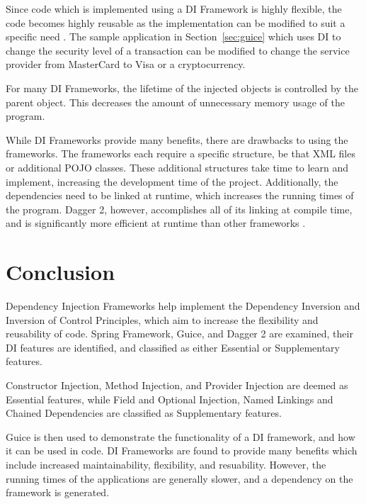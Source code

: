 \documentclass[12pt,twocolumn]{IEEEtran}
\begin{document}
Since code which is implemented using a DI Framework is highly flexible, the code becomes highly reusable as the implementation can be modified to suit a specific need \cite{hongyulyangewantemperohaydenmelton2008}. The sample application in Section~\ref{sec:guice} which uses DI to change the security level of a transaction can be modified to change the service provider from MasterCard to Visa or a cryptocurrency. 

For many DI Frameworks, the lifetime of the injected objects is controlled by the parent object. This decreases the amount of unnecessary memory usage of the program.

While DI Frameworks provide many benefits, there are drawbacks to using the frameworks. The frameworks each require a specific structure, be that XML files or additional POJO classes. These additional structures take time to learn and implement, increasing the development time of the project. Additionally, the dependencies need to be linked at runtime, which increases the running times of the program. Dagger 2, however, accomplishes all of its linking at compile time, and is significantly more efficient at runtime than other frameworks \cite{androiddeveloperguide}.


\section{Conclusion}

Dependency Injection Frameworks help implement the Dependency Inversion and Inversion of Control Principles, which aim to increase the flexibility and reusability of code. Spring Framework, Guice, and Dagger 2 are examined, their DI features are identified, and classified as either Essential or Supplementary features. 

Constructor Injection, Method Injection, and Provider Injection are deemed as Essential features, while Field and Optional Injection, Named Linkings and Chained Dependencies are classified as Supplementary features.

Guice is then used to demonstrate the functionality of a DI framework, and how it can be used in code. DI Frameworks are found to provide many benefits which include increased maintainability, flexibility, and resuability. However, the running times of the applications are generally slower, and a dependency on the framework is generated.



\end{document}
